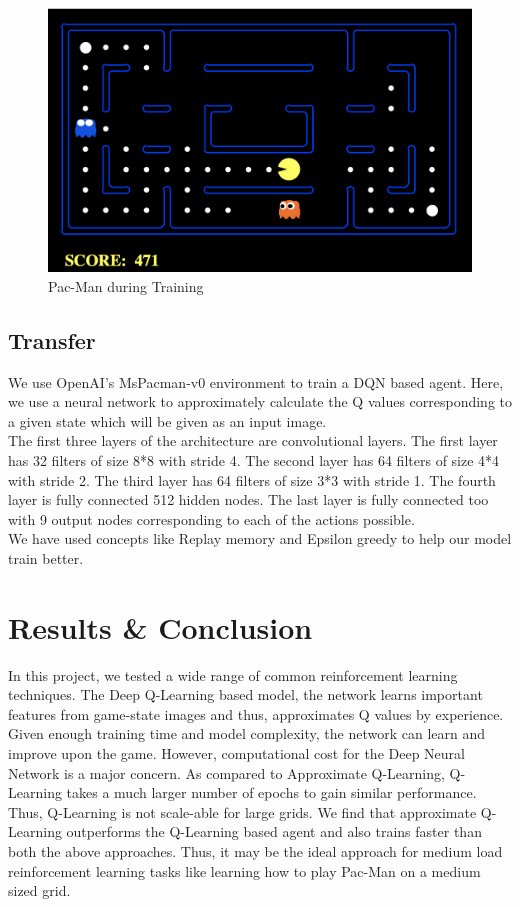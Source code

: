\documentclass[10pt,twocolumn,letterpaper]{article}
\begin{document}
\begin{figure}[h]
\begin{center}
\includegraphics[scale=0.25]{resources/game_preview.png}
\end{center}
\vspace{-0.2em}
\caption{Pac-Man during Training}
\label{fig:basic}
\end{figure}

\subsection{Transfer}
We use OpenAI's MsPacman-v0 environment to train a DQN based agent. Here, we use a neural network to approximately calculate the Q values corresponding to a given state which will be given as an input image.\\
The first three layers of the architecture are convolutional layers. The first layer has 32 filters of size 8*8 with stride 4. The second layer has 64 filters of size 4*4 with stride 2. The third layer has 64 filters of size 3*3 with stride 1. The fourth layer is fully connected 512 hidden nodes. The last layer is fully connected too with 9 output nodes corresponding to each of the actions possible.\\
We have used concepts like Replay memory and Epsilon greedy to help our model train better.



\section{Results \& Conclusion}
In this project, we tested a wide range of common reinforcement learning techniques. The Deep Q-Learning based model, the network learns important features from game-state images and thus, approximates Q values by experience. Given enough training time and model complexity, the network can learn and improve upon the game. However, computational cost for the Deep Neural Network is a major concern. As compared to Approximate Q-Learning, Q-Learning takes a much larger number of epochs to gain similar performance. Thus, Q-Learning is not scale-able for large grids.  We find that approximate Q-Learning outperforms the Q-Learning based agent and also trains faster than both the above approaches. Thus, it may be the ideal approach for medium load reinforcement learning tasks like learning how to play Pac-Man on a medium sized grid.\\
\end{document}
